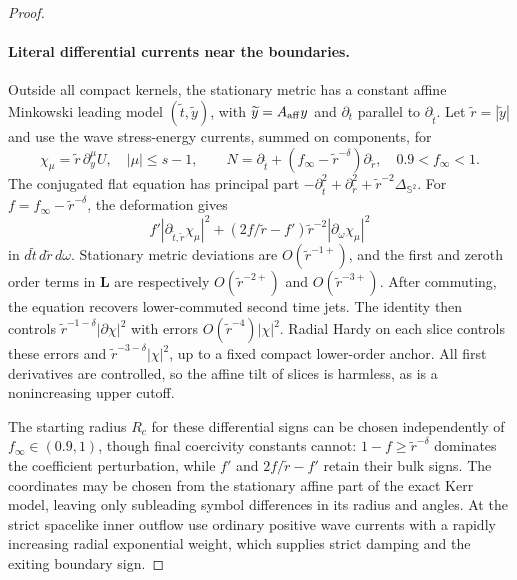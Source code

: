 \begin{proof}
\paragraph{Literal differential currents near the boundaries.}
Outside all compact kernels, the stationary metric has a constant affine
Minkowski leading model $(\widetilde t,\widetilde y)$, with
$\widetilde y=A_{\rm aff}y$ and $\partial_t$ parallel to
$\partial_{\widetilde t}$.  Let $\widetilde r=|\widetilde y|$ and use the
wave stress-energy currents, summed on components, for
\begin{equation}\label{co2:outer-current}
 \chi_\mu=\widetilde r\,\partial_y^\mu U,\quad |\mu|\le s-1,
 \qquad
 N=\partial_{\widetilde t}
       +(f_\infty-\widetilde r^{-\delta})\partial_{\widetilde r},
 \quad 0.9<f_\infty<1.
\end{equation}
The conjugated flat equation has principal part
$-\partial_{\widetilde t}^2+\partial_{\widetilde r}^2
 +\widetilde r^{-2}\Delta_{\mathbb S^2}$.  For
$f=f_\infty-\widetilde r^{-\delta}$, the deformation gives
\[
 f'|\partial_{\widetilde t,\widetilde r}\chi_\mu|^2
 +(2f/\widetilde r-f')\widetilde r^{-2}
                  |\partial_\omega\chi_\mu|^2
\]
in $d\widetilde t\,d\widetilde r\,d\omega$.  Stationary metric deviations
are $O(\widetilde r^{-1+})$, and the first and zeroth order terms in
$\mathbf L$ are respectively $O(\widetilde r^{-2+})$ and
$O(\widetilde r^{-3+})$.  After commuting, the equation recovers
lower-commuted second time jets.  The identity then controls
$\widetilde r^{-1-\delta}|\partial\chi|^2$ with errors
$O(\widetilde r^{-4})|\chi|^2$.  Radial Hardy on each slice controls these
errors and $\widetilde r^{-3-\delta}|\chi|^2$, up to a fixed compact
lower-order anchor.  All first derivatives are controlled, so the affine
tilt of slices is harmless, as is a nonincreasing upper cutoff.

The starting radius $R_c$ for these differential signs can be chosen
independently of $f_\infty\in(0.9,1)$, though final coercivity constants
cannot: $1-f\ge\widetilde r^{-\delta}$ dominates the coefficient
perturbation, while $f'$ and $2f/\widetilde r-f'$ retain their bulk signs.
The coordinates may be chosen from the stationary affine part of the exact
Kerr model, leaving only subleading symbol differences in its radius and
angles.  At the strict spacelike inner outflow use ordinary positive wave
currents with a rapidly increasing radial exponential weight, which supplies
strict damping and the exiting boundary sign.


\end{proof}
